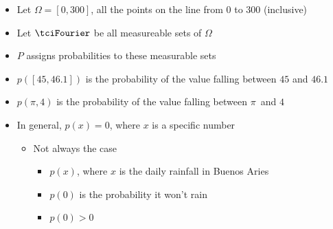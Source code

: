 \documentclass[notes=show]{beamer}
\begin{document}
\begin{frame}%


\begin{itemize}
\item Let $\Omega =\left[ 0,300\right] $, all the points on the line from $0$
to $300$ (inclusive)

\item Let $\tciFourier $ be all measureable sets of $\Omega $

\item $P$ assigns probabilities to these measurable sets

\item $p(\left[ 45,46.1\right] )$ is the probability of the value falling
between $45$ and $46.1$

\item $p\left( \pi ,4\right) $ is the probability of the value falling
between $\pi $\ and $4$

\item In general, $p\left( x\right) =0$, where $x$ is a specific number

\begin{itemize}
\item Not always the case

\begin{itemize}
\item $p\left( x\right) $, where $x$ is the daily rainfall in Buenos Aries

\item $p\left( 0\right) $ is the probability it won't rain

\item $p\left( 0\right) >0$
\end{itemize}
\end{itemize}
\end{itemize}

\end{frame}%
\end{document}
